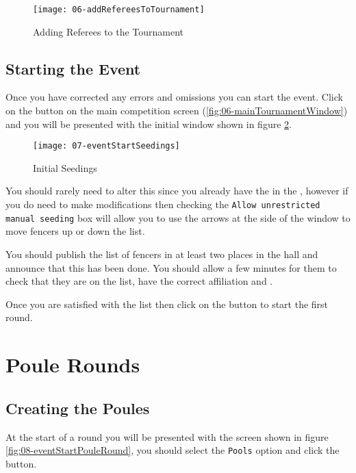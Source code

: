 \documentclass[a4paper,11pt]{memoir}
\begin{document}
\begin{figure}[!ht]
 \centering
 \texttt{[image: 06-addRefereesToTournament]}
 \caption{Adding Referees to the Tournament} \label{fig:06-addRefereesToTournament}
\end{figure}

\section{Starting the Event}
Once you have corrected any errors and omissions you can start the event. Click on the  button on the main competition screen (\ref{fig:06-mainTournamentWindow}) and you will be presented with the initial  window shown in figure \ref{fig:07-eventStartSeedings}.

\begin{figure}[!ht]
 \centering
 \texttt{[image: 07-eventStartSeedings]}
 \caption{Initial Seedings} \label{fig:07-eventStartSeedings}
\end{figure}

You should rarely need to alter this since you already have the  in the , however if you do need to make modifications then checking the \texttt{Allow unrestricted manual seeding} box will allow you to use the arrows at the side of the window to move fencers up or down the list.

You should publish the list of fencers in at least two places in the hall and announce that this has been done. You should allow a few minutes for them to check that they are on the list, have the correct affiliation and .

Once you are satisfied with the list then click on the  button to start the first round.

\chapter{Poule Rounds}

\section{Creating the Poules}

At the start of a round you will be presented with the screen shown in figure \ref{fig:08-eventStartPouleRound}, you should select the \texttt{Pools} option and click the  button. 
\end{document}
